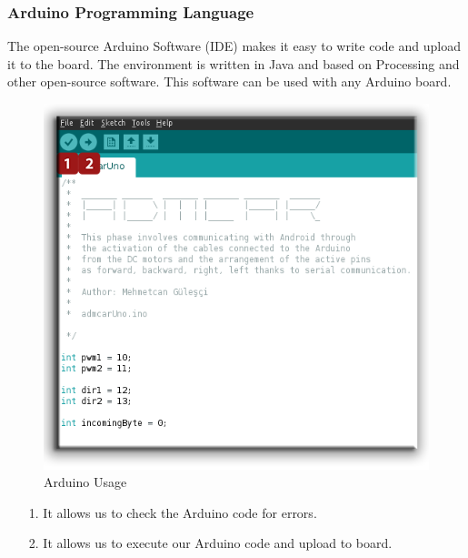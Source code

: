\documentclass[11pt]{article}
\begin{document}
\subsubsection{Arduino Programming Language}
\begin{flushleft}
The open-source Arduino Software (IDE) makes it easy to write code and upload it to the board. The environment is written in Java and based on Processing and other open-source software.  This software can be used with any Arduino board. 
\end{flushleft}
\vspace{0.2cm}
\begin{figure}[h]
\centering
\includegraphics[scale=0.6]{update_execute.png}
\caption{Arduino Usage}
\end{figure}
\vspace{0.2cm}
\begin{itemize}
\item[1.] It allows us to check the Arduino code for errors.
\item[2.] It allows us to execute our Arduino code and upload to board.
\end{itemize}
\vspace{0.2cm}

\pagebreak
\end{document}
